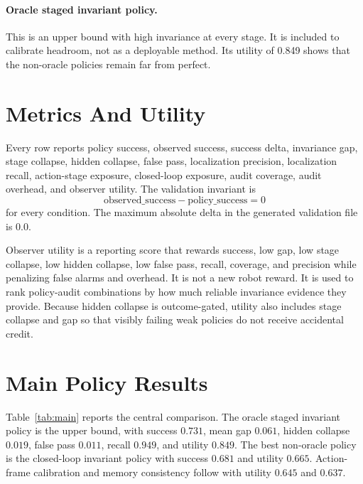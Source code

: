 \documentclass{article}
\begin{document}
\paragraph{Oracle staged invariant policy.}
This is an upper bound with high invariance at every stage. It is included to calibrate headroom, not as a deployable method. Its utility of 0.849 shows that the non-oracle policies remain far from perfect.

\section{Metrics And Utility}

Every row reports policy success, observed success, success delta, invariance gap, stage collapse, hidden collapse, false pass, localization precision, localization recall, action-stage exposure, closed-loop exposure, audit coverage, audit overhead, and observer utility. The validation invariant is
\[
    \mathrm{observed\_success} - \mathrm{policy\_success} = 0
\]
for every condition. The maximum absolute delta in the generated validation file is $0.0$.

Observer utility is a reporting score that rewards success, low gap, low stage collapse, low hidden collapse, low false pass, recall, coverage, and precision while penalizing false alarms and overhead. It is not a new robot reward. It is used to rank policy-audit combinations by how much reliable invariance evidence they provide. Because hidden collapse is outcome-gated, utility also includes stage collapse and gap so that visibly failing weak policies do not receive accidental credit.

\section{Main Policy Results}

\begin{table}[t]
\centering
\small
\resizebox{\linewidth}{!}{}
\caption{Main full-scale policy comparison. Utility uses success, gap, collapse, hidden collapse, false pass, recall, precision, coverage, false alarms, and overhead.}
\label{tab:main}
\end{table}

Table~\ref{tab:main} reports the central comparison. The oracle staged invariant policy is the upper bound, with success $0.731$, mean gap $0.061$, hidden collapse $0.019$, false pass $0.011$, recall $0.949$, and utility $0.849$. The best non-oracle policy is the closed-loop invariant policy with success $0.681$ and utility $0.665$. Action-frame calibration and memory consistency follow with utility $0.645$ and $0.637$.
\end{document}
